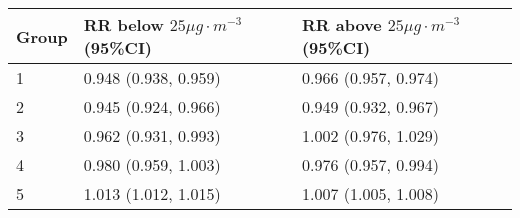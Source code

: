 \begin{tabular}{lll}
  \hline
Group & RR below $25 \mu g \cdot m^{-3}$ (95\%CI) & RR above $25 \mu g \cdot m^{-3}$ (95\%CI) \\ 
  \hline
   1 & 0.948 (0.938, 0.959) & 0.966 (0.957, 0.974) \\ 
     2 & 0.945 (0.924, 0.966) & 0.949 (0.932, 0.967) \\ 
     3 & 0.962 (0.931, 0.993) & 1.002 (0.976, 1.029) \\ 
     4 & 0.980 (0.959, 1.003) & 0.976 (0.957, 0.994) \\ 
     5 & 1.013 (1.012, 1.015) & 1.007 (1.005, 1.008) \\ 
   \hline
\end{tabular}

